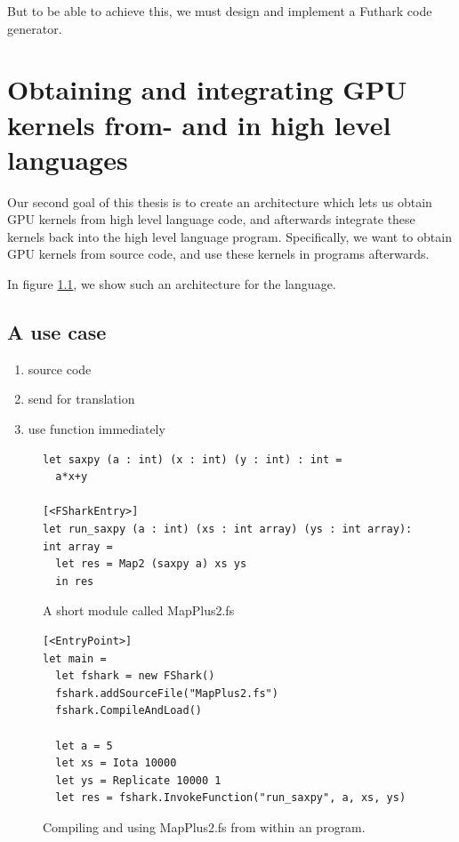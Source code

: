 But to be able to achieve this, we must design and implement a Futhark \csharp{}
code generator.

\section{Obtaining and integrating GPU kernels from- and in high level
  languages}
Our second goal of this thesis is to create an architecture which lets us obtain
GPU kernels from high level language code, and afterwards integrate these
kernels back into the high level language program.
Specifically, we want to obtain GPU kernels from \fsharp{} source code, and
use these kernels in \fsharp{} programs afterwards.

In figure \ref{}, we show such an architecture for the \fsharp{} language.

\subsection{A use case}
\begin{enumerate}
\item  source code
\item  send for translation
\item  use function immediately
\end{enumerate}

\begin{figure}[h]
  \centering
\begin{verbatim}
let saxpy (a : int) (x : int) (y : int) : int =
  a*x+y
  
[<FSharkEntry>]
let run_saxpy (a : int) (xs : int array) (ys : int array): int array =
  let res = Map2 (saxpy a) xs ys
  in res
\end{verbatim}
\caption{A short \fshark{} module called MapPlus2.fs}
\label{fig:shortfsharkprogram0}
\end{figure}


\begin{figure}[h]
  \centering
\begin{verbatim}
[<EntryPoint>]
let main =
  let fshark = new FShark()
  fshark.addSourceFile("MapPlus2.fs")
  fshark.CompileAndLoad()

  let a = 5
  let xs = Iota 10000
  let ys = Replicate 10000 1
  let res = fshark.InvokeFunction("run_saxpy", a, xs, ys)
\end{verbatim}
  \caption{Compiling and using MapPlus2.fs from within an \fsharp{} program.}
  \label{fig:shortfsharkprogram1}
\end{figure}



